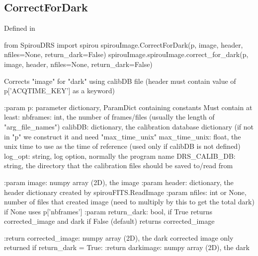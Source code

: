 \begin{minipage}{\textwidth}
\subsection{CorrectForDark}

Defined in \spirouImage{}

\begin{pythonbox}
from SpirouDRS import spirou
spirouImage.CorrectForDark(p, image, header, nfiles=None, return_dark=False)
spirouImage.spirouImage.correct_for_dark(p, image, header, nfiles=None, return_dark=False)
\end{pythonbox}

\begin{pythondocstring}
Corrects "image" for "dark" using calibDB file (header must contain
value of p['ACQTIME_KEY'] as a keyword)

:param p: parameter dictionary, ParamDict containing constants
    Must contain at least:
            nbframes: int, the number of frames/files (usually the length
                      of "arg_file_names")
            calibDB: dictionary, the calibration database dictionary
                     (if not in "p" we construct it and need "max_time_unix"
            max_time_unix: float, the unix time to use as the time of
                            reference (used only if calibDB is not defined)
            log_opt: string, log option, normally the program name
            DRS_CALIB_DB: string, the directory that the calibration
                          files should be saved to/read from

:param image: numpy array (2D), the image
:param header: dictionary, the header dictionary created by
               spirouFITS.ReadImage
:param nfiles: int or None, number of files that created image (need to
               multiply by this to get the total dark) if None uses
               p['nbframes']
:param return_dark: bool, if True returns corrected_image and dark
                    if False (default) returns corrected_image

:return corrected_image: numpy array (2D), the dark corrected image
                         only returned if return_dark = True:
:return darkimage: numpy array (2D), the dark
\end{pythondocstring}
\end{minipage}


